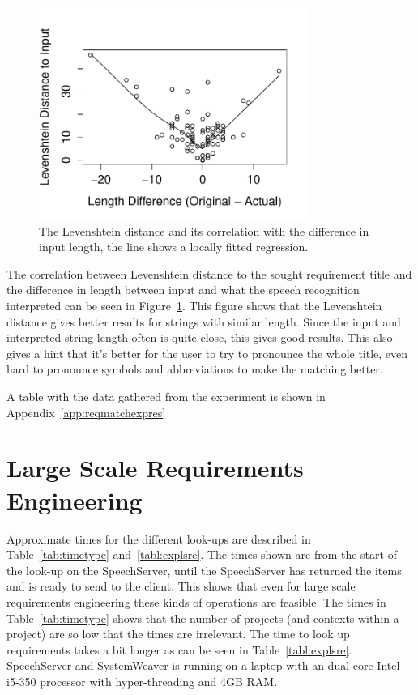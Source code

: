 \begin{figure}[h]
\centering
\includegraphics[width = 250pt, keepaspectratio = true]{fig/levdif}
\caption{The Levenshtein distance and its correlation with the difference in input length, the line shows a locally fitted regression.}
\label{fig:levdif}
\end{figure}

\FloatBarrier

The correlation between Levenshtein distance to the sought requirement title and the difference in length between input and what the speech recognition interpreted can be seen in Figure~\ref{fig:levdif}. This figure shows that the Levenshtein distance gives better results for strings with similar length. Since the input and interpreted string length often is quite close, this gives good results. This also gives a hint that it's better for the user to try to pronounce the whole title, even hard to pronounce symbols and abbreviations to make the matching better.

A table with the data gathered from the experiment is shown in Appendix~\ref{app:reqmatchexpres}

\section{Large Scale Requirements Engineering}
\label{eval:lsre}
Approximate times for the different look-ups are described in Table~\ref{tab:timetype} and~\ref{tabl:explsre}. The times shown are from the start of the look-up on the SpeechServer, until the SpeechServer has returned the items and is ready to send to the client. This shows that even for large scale requirements engineering these kinds of operations are feasible. The times in Table~\ref{tab:timetype} shows that the number of projects (and contexts within a project) are so low that the times are irrelevant. The time to look up requirements takes a bit longer as can be seen in Table~\ref{tabl:explsre}. SpeechServer and SystemWeaver is running on a laptop with an dual core Intel i5-350 processor with hyper-threading and 4GB RAM.

